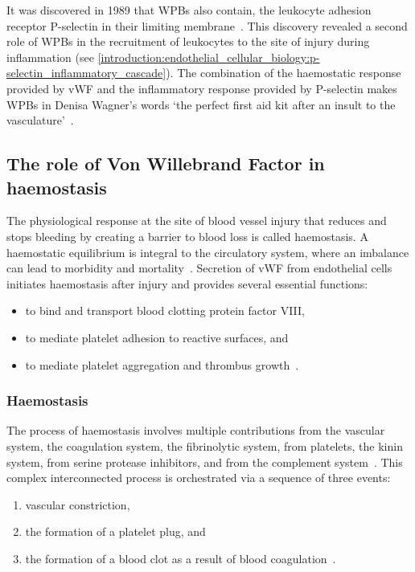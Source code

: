 It was discovered in 1989 that WPBs also contain, the leukocyte adhesion receptor P-selectin in their limiting membrane~\cite{Bonfanti1989,McEver1989}. This discovery revealed a second role of WPBs in the recruitment of leukocytes to the site of injury during inflammation (see \autoref{introduction:endothelial_cellular_biology:p-selectin_inflammatory_cascade}). The combination of the haemostatic response provided by vWF and the inflammatory response provided by P-selectin makes WPBs in Denisa Wagner's words `the perfect first aid kit after an insult to the vasculature'~\cite{Weibel2012}.

\subsection{The role of Von Willebrand Factor in haemostasis}
\label{introduction:endothelial_cellular_biology:vwf_in_haemostasis}
The physiological response at the site of blood vessel injury that reduces and stops bleeding by creating a barrier to blood loss is called haemostasis. A haemostatic equilibrium is integral to the circulatory system, where an imbalance can lead to morbidity and mortality~\cite{Rasche2001}. Secretion of vWF from endothelial cells initiates haemostasis after injury and provides several essential functions:
\begin{itemize}
\item to bind and transport blood clotting protein factor VIII,
\item to mediate platelet adhesion to reactive surfaces, and
\item to mediate platelet aggregation and thrombus growth~\cite{Ruggeri2007}.
\end{itemize}


\subsubsection{Haemostasis}
The process of haemostasis involves multiple contributions from the vascular system, the coagulation system, the fibrinolytic system, from platelets, the kinin system, from serine protease inhibitors, and from the complement system~\cite{Boon1993}. This complex interconnected process is orchestrated via a sequence of three events:
\begin{enumerate}
\item vascular constriction,
\item the formation of a platelet plug, and
\item the formation of a blood clot as a result of blood coagulation~\cite{Hall2011}.
\end{enumerate}

